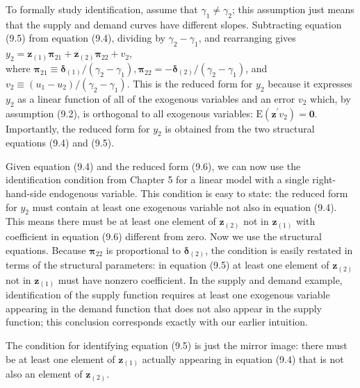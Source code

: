 \documentclass[10pt]{article}
\begin{document}
To formally study identification, assume that $\gamma_{1} \neq \gamma_{2}$; this assumption just means that the supply and demand curves have different slopes. Subtracting equation (9.5) from equation (9.4), dividing by $\gamma_{2}-\gamma_{1}$, and rearranging gives\\
$y_{2}=\mathbf{z}_{(1)} \boldsymbol{\pi}_{21}+\mathbf{z}_{(2)} \boldsymbol{\pi}_{22}+v_{2}$,\\
where $\boldsymbol{\pi}_{21} \equiv \boldsymbol{\delta}_{(1)} /\left(\gamma_{2}-\gamma_{1}\right), \boldsymbol{\pi}_{22}=-\boldsymbol{\delta}_{(2)} /\left(\gamma_{2}-\gamma_{1}\right)$, and $v_{2} \equiv\left(u_{1}-u_{2}\right) /\left(\gamma_{2}-\gamma_{1}\right)$. This is the reduced form for $y_{2}$ because it expresses $y_{2}$ as a linear function of all of the exogenous variables and an error $v_{2}$ which, by assumption (9.2), is orthogonal to all exogenous variables: $\mathrm{E}\left(\mathbf{z}^{\prime} v_{2}\right)=\mathbf{0}$. Importantly, the reduced form for $y_{2}$ is obtained from the two structural equations (9.4) and (9.5).

Given equation (9.4) and the reduced form (9.6), we can now use the identification condition from Chapter 5 for a linear model with a single right-hand-side endogenous variable. This condition is easy to state: the reduced form for $y_{2}$ must contain at least one exogenous variable not also in equation (9.4). This means there must be at least one element of $\mathbf{z}_{(2)}$ not in $\mathbf{z}_{(1)}$ with coefficient in equation (9.6) different from zero. Now we use the structural equations. Because $\boldsymbol{\pi}_{22}$ is proportional to $\boldsymbol{\delta}_{(2)}$, the condition is easily restated in terms of the structural parameters: in equation (9.5) at least one element of $\mathbf{z}_{(2)}$ not in $\mathbf{z}_{(1)}$ must have nonzero coefficient. In the supply and demand example, identification of the supply function requires at least one exogenous variable appearing in the demand function that does not also appear in the supply function; this conclusion corresponds exactly with our earlier intuition.

The condition for identifying equation (9.5) is just the mirror image: there must be at least one element of $\mathbf{z}_{(1)}$ actually appearing in equation (9.4) that is not also an element of $\mathbf{z}_{(2)}$.
\end{document}
